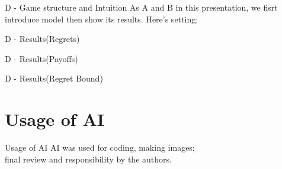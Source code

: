 \documentclass{beamer}
\begin{document}
\begin{frame}{D - Game structure and Intuition}
As A and B in this presentation, we fisrt introduce model then show its results.
Here's setting; 

    
\end{frame}

\begin{frame}{D - Results(Regrets)}

    
\end{frame}

\begin{frame}{D - Results(Payoffs)}

    
\end{frame}

\begin{frame}{D - Results(Regret Bound)}

    
\end{frame}

\section{Usage of AI}
\begin{frame}{Usage of AI}
    AI was used for coding, making images;\\
    final review and responsibility by the authors.
\end{frame}
\end{document}
